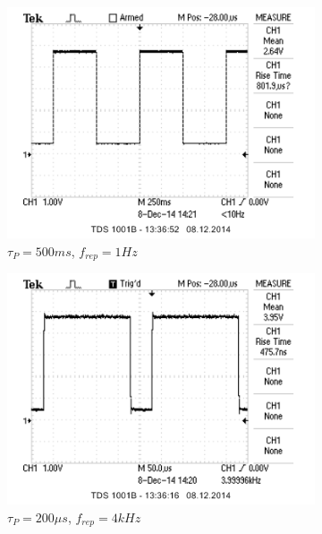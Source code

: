 \documentclass[bigchapter,colorback,accentcolor=tud4b,linedtoc,11pt]{tudreport}
\begin{document}
\begin{figure}[H]
  \centering
  \begin{subfigure}[h]{0.3\textwidth}
    \includegraphics[width=\textwidth]{data/Aufgabe5/1Hz-500ms.png}
    \caption[Cap for listoffigures]{$\tau_P = 500ms$, $f_{rep} = 1Hz$}
    \label{fig:1Hz500ms}
  \end{subfigure}%
  \begin{subfigure}[h]{0.3\textwidth}
    \includegraphics[width=\textwidth]{data/Aufgabe5/4kHz-200us.png}
    \caption[Cap for listoffigures]{$\tau_P = 200\mu s$, $f_{rep} = 4kHz$}
    \label{fig:4kHz200ys}
  \end{subfigure}
  \begin{subfigure}[h]{0.3\textwidth}

\end{subfigure}
\end{figure}
\end{document}
